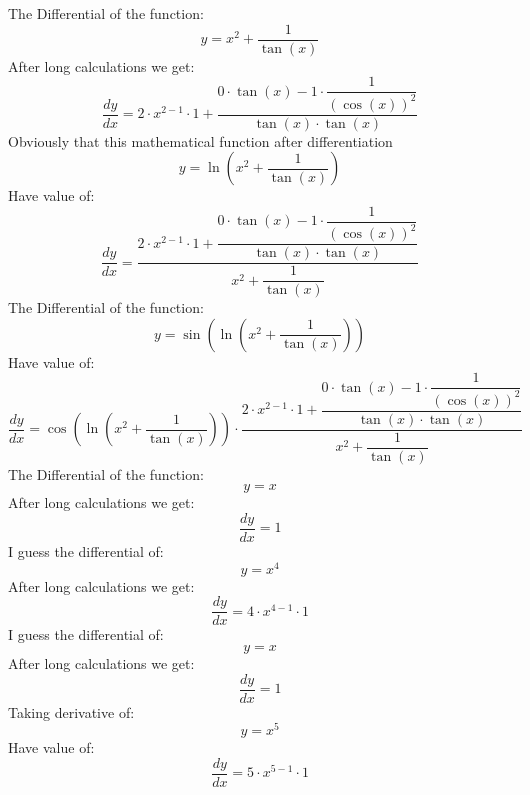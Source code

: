 \documentclass{article}
\begin{document}
\begin{center}
The Differential of the function:
\begin{dmath}
 y = x^{2}+\dfrac{1}{\tan (x)}
\end{dmath}
After long calculations we get:
\begin{dmath}
 \frac{dy}{dx} = 2\cdot x^{2-1}\cdot 1+\dfrac{0\cdot \tan (x)-1\cdot \dfrac{1}{(\cos (x))^{2}}}{\tan (x)\cdot \tan (x)}
\end{dmath}
Obviously that this mathematical function after differentiation
\begin{dmath}
 y = \ln (x^{2}+\dfrac{1}{\tan (x)})
\end{dmath}
Have value of:
\begin{dmath}
 \frac{dy}{dx} = \dfrac{2\cdot x^{2-1}\cdot 1+\dfrac{0\cdot \tan (x)-1\cdot \dfrac{1}{(\cos (x))^{2}}}{\tan (x)\cdot \tan (x)}}{x^{2}+\dfrac{1}{\tan (x)}}
\end{dmath}
The Differential of the function:
\begin{dmath}
 y = \sin (\ln (x^{2}+\dfrac{1}{\tan (x)}))
\end{dmath}
Have value of:
\begin{dmath}
 \frac{dy}{dx} = \cos (\ln (x^{2}+\dfrac{1}{\tan (x)}))\cdot \dfrac{2\cdot x^{2-1}\cdot 1+\dfrac{0\cdot \tan (x)-1\cdot \dfrac{1}{(\cos (x))^{2}}}{\tan (x)\cdot \tan (x)}}{x^{2}+\dfrac{1}{\tan (x)}}
\end{dmath}
The Differential of the function:
\begin{dmath}
 y = x
\end{dmath}
After long calculations we get:
\begin{dmath}
 \frac{dy}{dx} = 1
\end{dmath}
I guess the differential of:
\begin{dmath}
 y = x^{4}
\end{dmath}
After long calculations we get:
\begin{dmath}
 \frac{dy}{dx} = 4\cdot x^{4-1}\cdot 1
\end{dmath}
I guess the differential of:
\begin{dmath}
 y = x
\end{dmath}
After long calculations we get:
\begin{dmath}
 \frac{dy}{dx} = 1
\end{dmath}
Taking derivative of:
\begin{dmath}
 y = x^{5}
\end{dmath}
Have value of:
\begin{dmath}
 \frac{dy}{dx} = 5\cdot x^{5-1}\cdot 1
\end{dmath}

\end{center}
\end{document}
